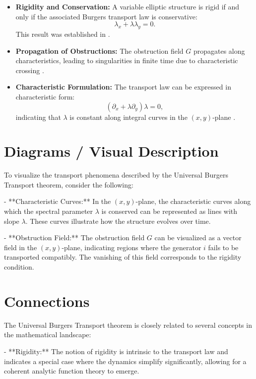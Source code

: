 \documentclass[11pt,a4paper]{article}
\begin{document}
\begin{itemize}
    \item \textbf{Rigidity and Conservation:} A variable elliptic structure is rigid if and only if the associated Burgers transport law is conservative:
    $$
    \lambda_x + \lambda \lambda_y = 0.
    $$
    This result was established in \cite{2601.19274v4}.

    \item \textbf{Propagation of Obstructions:} The obstruction field $G$ propagates along characteristics, leading to singularities in finite time due to characteristic crossing \cite{2601.19274v4}.

    \item \textbf{Characteristic Formulation:} The transport law can be expressed in characteristic form:
    $$
    \left( \partial_x + \lambda \partial_y \right) \lambda = 0,
    $$
    indicating that $\lambda$ is constant along integral curves in the $(x, y)$-plane \cite{2601.19274v4}.
\end{itemize}

\section{Diagrams / Visual Description}
To visualize the transport phenomena described by the Universal Burgers Transport theorem, consider the following:

- **Characteristic Curves:** In the $(x, y)$-plane, the characteristic curves along which the spectral parameter $\lambda$ is conserved can be represented as lines with slope $\lambda$. These curves illustrate how the structure evolves over time.

- **Obstruction Field:** The obstruction field $G$ can be visualized as a vector field in the $(x, y)$-plane, indicating regions where the generator $i$ fails to be transported compatibly. The vanishing of this field corresponds to the rigidity condition.

\section{Connections}
The Universal Burgers Transport theorem is closely related to several concepts in the mathematical landscape:

- **Rigidity:** The notion of rigidity is intrinsic to the transport law and indicates a special case where the dynamics simplify significantly, allowing for a coherent analytic function theory to emerge.
\end{document}
